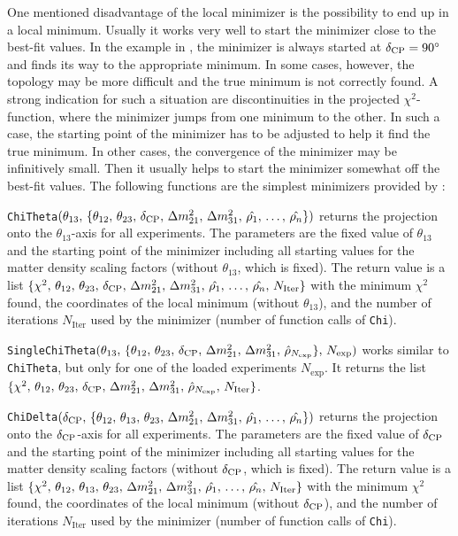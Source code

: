 One mentioned disadvantage of the local minimizer is the possibility to end up in a local minimum. Usually it works very well to start the minimizer close to the best-fit values. In the example in , the minimizer is always started at $\delta_{\mathrm{CP}}=90^\circ$ and finds its way to the appropriate minimum. In some cases, however, the topology may be more difficult and the true minimum is not correctly found. A strong indication for such a situation are discontinuities in the projected $\chi^2$-function, where the minimizer jumps from one minimum to the other. In such a case, the starting point of the minimizer has to be adjusted to help it find the true minimum. In other cases, the convergence of the minimizer may be infinitively small. Then it usually helps to start the minimizer somewhat off the best-fit values. The following functions are the simplest minimizers provided by \GLOBES :
\begin{function}
{\tt ChiTheta}$( \theta_{13}, \, \{ \theta_{12}, \, \theta_{23}, \, \delta_{\mathrm{CP}} , \, \Delta m_{21}^2 , \, \Delta m_{31}^2, \, \hat{\rho_1}, \,  \hdots ,  \,\hat{\rho_n} \})$ returns the projection onto the $\theta_{13}$-axis for all experiments. The parameters are the fixed value of $\theta_{13}$ and the starting point of the minimizer including all starting values for the matter density scaling factors (without $\theta_{13}$, which is fixed). The return value is a list $\{ \chi^2, \, \theta_{12}, \, \theta_{23}, \, \delta_{\mathrm{CP}} , \, \Delta m_{21}^2 , \, \Delta m_{31}^2, \, \hat{\rho_1}, \, \hdots , \, \hat{\rho_n} , \, N_{\mathrm{Iter}} \}$ with the minimum $\chi^2$ found, the coordinates of the local minimum (without $\theta_{13}$), and the number of iterations $N_{\mathrm{Iter}}$ used by the minimizer (number of function calls of {\tt Chi}).
\end{function}
\begin{function}
{\tt SingleChiTheta}$( \theta_{13}, \, \{ \theta_{12}, \, \theta_{23}, \, \delta_{\mathrm{CP}} , \, \Delta m_{21}^2 , \, \Delta m_{31}^2,  \, \hat{\rho}_{N_{\mathrm{exp}}} \}, \, N_{\mathrm{exp}})$ works similar to {\tt ChiTheta}, but only for one of the loaded experiments $N_{\mathrm{exp}}$. It returns the list $\{ \chi^2, \, \theta_{12}, \,  \theta_{23}, \, \delta_{\mathrm{CP}} , \, \Delta m_{21}^2 , \, \Delta m_{31}^2, \, \hat{\rho}_{N_{\mathrm{exp}}} , \, N_{\mathrm{Iter}} \}$.
\end{function}
\begin{function}
{\tt ChiDelta}$( \delta_{\mathrm{CP}}, \, \{ \theta_{12}, \, \theta_{13}, \, \theta_{23}, \, \Delta m_{21}^2 , \, \Delta m_{31}^2, \, \hat{\rho_1}, \,  \hdots ,  \,\hat{\rho_n} \})$ returns the projection onto the $\delta_{\mathrm{CP}}$-axis for all experiments. The parameters are the fixed value of $\delta_{\mathrm{CP}}$ and the starting point of the minimizer including all starting values for the matter density scaling factors (without $\delta_{\mathrm{CP}}$, which is fixed). The return value is a list $\{ \chi^2, \, \theta_{12}, \, \theta_{13}, \, \theta_{23}, \, \Delta m_{21}^2 , \, \Delta m_{31}^2, \, \hat{\rho_1}, \, \hdots , \, \hat{\rho_n} , \, N_{\mathrm{Iter}} \}$ with the minimum $\chi^2$ found, the coordinates of the local minimum (without $\delta_{\mathrm{CP}}$), and the number of iterations $N_{\mathrm{Iter}}$ used by the minimizer (number of function calls of {\tt Chi}).
\end{function}

